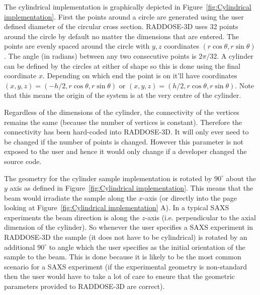 The cylindrical implementation is graphically depicted in Figure~\ref{fig:Cylindrical implementation}.
First the points around a circle are generated using the user defined diameter of the circular cross section.
RADDOSE-3D uses 32 points around the circle by default no matter the dimensions that are entered.
The points are evenly spaced around the circle with $y, z$ coordinates $(r \cos \theta, r \sin \theta)$.
The angle (in radians) between any two consecutive points is $2 \pi / 32$.
A cylinder can be defined by the circles at either of shape so this is done using the final coordinate $x$.
Depending on which end the point is on it'll have coordinates $(x, y, z) = (-h/2, r \cos \theta, r \sin \theta)$ or $(x, y, z) = (h/2, r \cos \theta, r \sin \theta)$.
Note that this means the origin of the system is at the very centre of the cylinder.

Regardless of the dimensions of the cylinder, the connectivity of the vertices remains the same (because the number of vertices is constant).
Therefore the connectivity has been hard-coded into RADDOSE-3D.
It will only ever need to be changed if the number of points is changed.
However this parameter is not exposed to the user and hence it would only change if a developer changed the source code.

The geometry for the cylinder sample implementation is rotated by $90^{\circ}$ about the $y$ axis as defined in Figure~\ref{fig:Cylindrical implementation}.
This means that the beam would irradiate the sample along the $x$-axis (or directly into the page looking at Figure~\ref{fig:Cylindrical implementation} A).
In a typical SAXS experiments the beam direction is along the $z$-axis (i.e. perpendicular to the axial dimension of the cylinder).
So whenever the user specifies a SAXS experiment in RADDOSE-3D the sample (it does not have to be cylindrical) is rotated by an additional $90^{\circ}$ to angle which the user specifies as the initial orientation of the sample to the beam.
This is done because it is likely to be the most common scenario for a SAXS experiment (if the experimental geometry is non-standard then the user would have to take a lot of care to ensure that the geometric parameters provided to RADDOSE-3D are correct).

